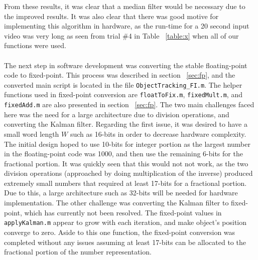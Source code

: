 \documentclass[12pt]{article} %
\begin{document}
\FloatBarrier
\noindent
From these results, it was clear that a median filter would be necessary due to the improved results. It was also clear that there was good motive for implementing this algorithm in hardware, as the run-time for a 20 second input video was very long as seen from trial \#4 in Table ~\ref{table:x} when all of our functions were used. \\\\
The next step in software development was converting the stable floating-point code to fixed-point. This process was described in section ~\ref{sec:fp}, and the converted main script is located in the file \texttt{ObjectTracking\_FI.m}. The helper functions used in fixed-point conversion are \texttt{floatToFix.m}, \texttt{fixedMult.m}, and \texttt{fixedAdd.m} are also presented in section ~\ref{sec:fp}. The two main challenges faced here was the need for a large architecture due to division operations, and converting the Kalman filter. Regarding the first issue, it was desired to have a small word length $W$ such as 16-bits in order to decrease hardware complexity. The initial design hoped to use 10-bits for integer portion as the largest number in the floating-point code was 1000, and then use the remaining 6-bits for the fractional portion. It was quickly seen that this would not not work, as the two division operations (approached by doing multiplication of the inverse) produced extremely small numbers that required at least 17-bits for a fractional portion. Due to this, a large architecture such as 32-bits will be needed for hardware implementation. The other challenge was converting the Kalman filter to fixed-point, which has currently not been resolved. The fixed-point values in \texttt{applyKalman.m} appear to grow with each iteration, and make object's position converge to zero. Aside to this one function, the fixed-point conversion was completed without any issues assuming at least 17-bits can be allocated to the fractional portion of the number representation.
\end{document}
